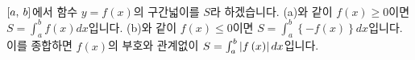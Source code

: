 \begin{figure}[h]\centering {}\
\qquad
\centering {}\
\end{figure}


$\left[a,\: b\right]$에서 함수 $y=f\left( x \right) $의 구간넓이를 $S$라 하겠습니다. (a)와 같이 $f\left( x \right)\ge 0$이면 $S= \int_{a}^{b}f\left( x \right) dx$입니다. (b)와 같이 $f\left( x \right)\le0 $이면  $S=\int_{a}^{b}\left\{ -f\left( x \right) \right\} dx $입니다. 이를 종합하면 $f\left( x \right) $의 부호와 관계없이 $S=\int_{a}^{b}\left|f\left( x \right) \right|dx$입니다. 

